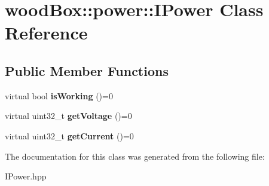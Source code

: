 \hypertarget{classwood_box_1_1power_1_1_i_power}{}\section{wood\+Box\+:\+:power\+:\+:I\+Power Class Reference}
\label{classwood_box_1_1power_1_1_i_power}
\subsection*{Public Member Functions}
\begin{DoxyCompactItemize}
\item 
\mbox{\label{classwood_box_1_1power_1_1_i_power_a4645f7d9dbbaee583ba2446ef35a8635}} 
virtual bool {\bfseries is\+Working} ()=0
\item 
\mbox{\label{classwood_box_1_1power_1_1_i_power_a67086e56aca8cb46033a441b3f4e11aa}} 
virtual uint32\+\_\+t {\bfseries get\+Voltage} ()=0
\item 
\mbox{\label{classwood_box_1_1power_1_1_i_power_a9b3e0363c22d3064bd7ccc8663f1a033}} 
virtual uint32\+\_\+t {\bfseries get\+Current} ()=0
\end{DoxyCompactItemize}


The documentation for this class was generated from the following file\+:\begin{DoxyCompactItemize}
\item 
I\+Power.\+hpp\end{DoxyCompactItemize}
